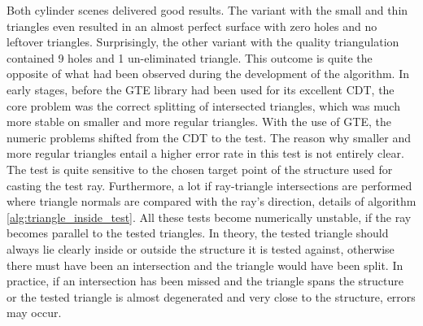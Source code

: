 Both cylinder scenes delivered good results.
The variant with the small and thin triangles even resulted in an almost perfect surface with zero holes and no leftover triangles.
Surprisingly, the other variant with the quality triangulation contained 9 holes and 1 un-eliminated triangle.
This outcome is quite the opposite of what had been observed during the development of the algorithm.
In early stages, before the GTE library had been used for its excellent CDT, the core problem was the correct splitting of intersected triangles, which was much more stable on smaller and more regular triangles.
With the use of GTE, the numeric problems shifted from the CDT to the  test.
The reason why smaller and more regular triangles entail a higher error rate in this test is not entirely clear.
The test is quite sensitive to the chosen target point of the structure used for casting the test ray.
Furthermore, a lot if ray-triangle intersections are performed where triangle normals are compared with the ray's direction, \cf details of algorithm \ref{alg:triangle_inside_test}.
All these tests become numerically unstable, if the ray becomes parallel to the tested triangles.
In theory, the tested triangle should always lie clearly inside or outside the structure it is tested against, otherwise there must have been an intersection and the triangle would have been split.
In practice, if an intersection has been missed and the triangle spans the structure or the tested triangle is almost degenerated and very close to the structure, errors may occur.

